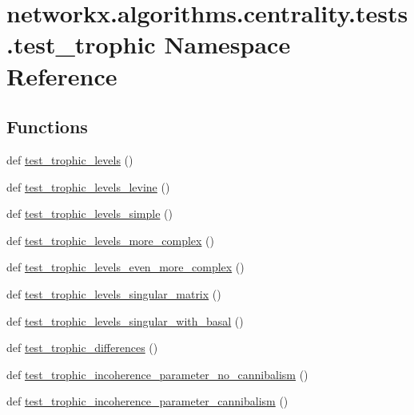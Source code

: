 \hypertarget{namespacenetworkx_1_1algorithms_1_1centrality_1_1tests_1_1test__trophic}{}\section{networkx.\+algorithms.\+centrality.\+tests.\+test\+\_\+trophic Namespace Reference}
\label{namespacenetworkx_1_1algorithms_1_1centrality_1_1tests_1_1test__trophic}
\subsection*{Functions}
\begin{DoxyCompactItemize}
\item 
def \hyperlink{namespacenetworkx_1_1algorithms_1_1centrality_1_1tests_1_1test__trophic_ade7cb378d938f207eac9a1d8c7aa799d}{test\+\_\+trophic\+\_\+levels} ()
\item 
def \hyperlink{namespacenetworkx_1_1algorithms_1_1centrality_1_1tests_1_1test__trophic_a59d53d1f291f9e344c31df8ba4fb18c6}{test\+\_\+trophic\+\_\+levels\+\_\+levine} ()
\item 
def \hyperlink{namespacenetworkx_1_1algorithms_1_1centrality_1_1tests_1_1test__trophic_af3ada21f982dbf0aa8711d8e837f4da4}{test\+\_\+trophic\+\_\+levels\+\_\+simple} ()
\item 
def \hyperlink{namespacenetworkx_1_1algorithms_1_1centrality_1_1tests_1_1test__trophic_a2fe12c3e393c2ee84b1e6d2ffe5715aa}{test\+\_\+trophic\+\_\+levels\+\_\+more\+\_\+complex} ()
\item 
def \hyperlink{namespacenetworkx_1_1algorithms_1_1centrality_1_1tests_1_1test__trophic_a3da5e7903f415fff7899cd168abecd61}{test\+\_\+trophic\+\_\+levels\+\_\+even\+\_\+more\+\_\+complex} ()
\item 
def \hyperlink{namespacenetworkx_1_1algorithms_1_1centrality_1_1tests_1_1test__trophic_a47ceb96f63c4bec0612bf87929f20fb2}{test\+\_\+trophic\+\_\+levels\+\_\+singular\+\_\+matrix} ()
\item 
def \hyperlink{namespacenetworkx_1_1algorithms_1_1centrality_1_1tests_1_1test__trophic_a89d39da784a1cbd73ab416f39acfacd7}{test\+\_\+trophic\+\_\+levels\+\_\+singular\+\_\+with\+\_\+basal} ()
\item 
def \hyperlink{namespacenetworkx_1_1algorithms_1_1centrality_1_1tests_1_1test__trophic_a4f135c438f0f141efd522c586bb26533}{test\+\_\+trophic\+\_\+differences} ()
\item 
def \hyperlink{namespacenetworkx_1_1algorithms_1_1centrality_1_1tests_1_1test__trophic_ab04c812015baef9f043951a9ad0b97ed}{test\+\_\+trophic\+\_\+incoherence\+\_\+parameter\+\_\+no\+\_\+cannibalism} ()
\item 
def \hyperlink{namespacenetworkx_1_1algorithms_1_1centrality_1_1tests_1_1test__trophic_a3cdea7f4823ac5fa42ef9b849752e8bf}{test\+\_\+trophic\+\_\+incoherence\+\_\+parameter\+\_\+cannibalism} ()
\end{DoxyCompactItemize}

